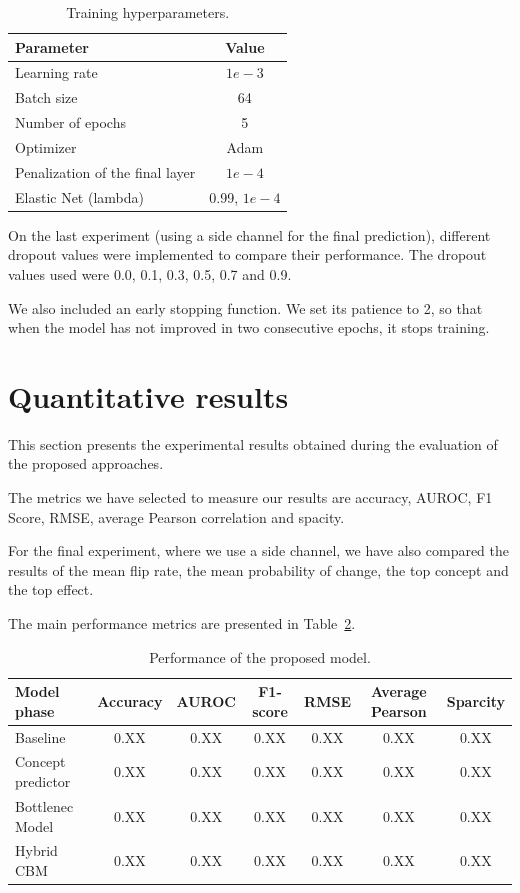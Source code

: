 \documentclass[11pt,a4paper,twocolumn]{article}
\begin{document}
\begin{table}[H]
    \centering
    \caption{Training hyperparameters.}
    \label{tab:hyperparameters}
    \begin{tabular}{lc}
        \toprule
        Parameter & Value \\
        \midrule
        Learning rate & $1e-3$ \\
        Batch size & 64 \\
        Number of epochs & 5 \\
        Optimizer & Adam \\
        Penalization of the final layer & $1e-4$ \\
        Elastic Net (lambda) & 0.99, $1e-4$ \\
        \bottomrule
    \end{tabular}
\end{table}

On the last experiment (using a side channel for the final prediction), different dropout values were implemented to compare their performance. The dropout values used were 0.0, 0.1, 0.3, 0.5, 0.7 and 0.9.

We also included an early stopping function. We set its patience to 2, so that when the model has not improved in two consecutive epochs, it stops training. 


\section{Quantitative results}
\label{sec:results}

This section presents the experimental results obtained during
the evaluation of the proposed approaches.

The metrics we have selected to measure our results are accuracy, AUROC, F1 Score, RMSE, average Pearson correlation and spacity\cite{sparcity}. 

For the final experiment, where we use a side channel, we have also compared the results of the mean flip rate, the mean probability of change, the top concept and the top effect.

The main performance metrics are presented in
Table~\ref{tab:results}.

\begin{table}[H]
    \centering
    \caption{Performance of the proposed model.}
    \label{tab:results}
    \begin{tabular}{lcccccc}
        \toprule
        Model phase & Accuracy & AUROC & F1-score & RMSE & Average Pearson & Sparcity \\
        \midrule
        Baseline & 0.XX & 0.XX & 0.XX & 0.XX & 0.XX & 0.XX  \\
        Concept predictor & 0.XX & 0.XX & 0.XX & 0.XX & 0.XX & 0.XX\\
        Bottlenec Model & 0.XX & 0.XX & 0.XX & 0.XX & 0.XX & 0.XX\\
        Hybrid CBM & 0.XX & 0.XX & 0.XX & 0.XX & 0.XX & 0.XX\\
        \bottomrule
    \end{tabular}
\end{table}
\end{document}
